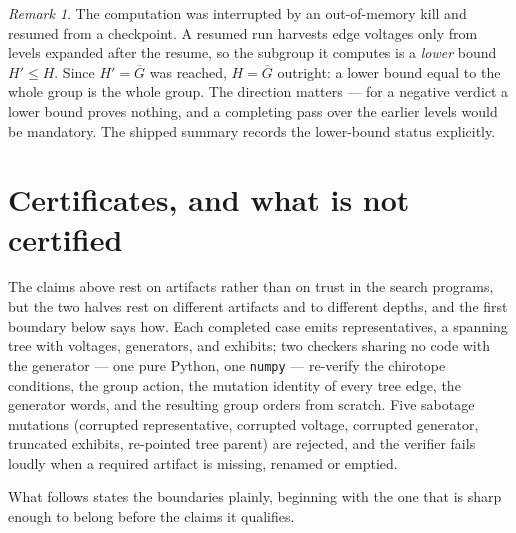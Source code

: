 \documentclass[11pt]{amsart}
\theoremstyle{remark}
\newtheorem{remark}[theorem]{Remark}
\newcommand{\Gbar}{\overline{G}}
\begin{document}
\begin{remark}
The computation was interrupted by an out-of-memory kill and resumed from
a checkpoint. A resumed run harvests edge voltages only from levels
expanded after the resume, so the subgroup it computes is a \emph{lower}
bound $H'\le H$. Since $H'=\Gbar$ was reached, $H=\Gbar$ outright: a
lower bound equal to the whole group is the whole group. The direction
matters --- for a negative verdict a lower bound proves nothing, and a
completing pass over the earlier levels would be mandatory. The shipped
summary records the lower-bound status explicitly.
\end{remark}

\section{Certificates, and what is not certified}\label{sec:honesty}

The claims above rest on artifacts rather than on trust in the search
programs, but the two halves rest on different artifacts and to different
depths, and the first boundary below says how.
Each completed case emits representatives, a spanning tree with voltages,
generators, and exhibits; two checkers sharing no code with the generator
--- one pure Python, one \texttt{numpy} --- re-verify the chirotope
conditions, the group action, the mutation identity of every tree edge,
the generator words, and the resulting group orders from scratch. Five
sabotage mutations (corrupted representative, corrupted voltage,
corrupted generator, truncated exhibits, re-pointed tree parent) are
rejected, and the verifier fails loudly when a required artifact is
missing, renamed or emptied.

What follows states the boundaries plainly, beginning with the one that is
sharp enough to belong before the claims it qualifies.
\end{document}
